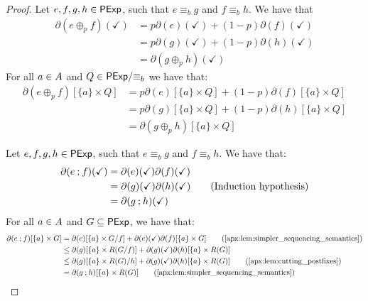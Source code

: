 \begin{proof}
    \item {}
    Let $e,f,g,h \in \mathsf{PExp}$, such that $e \equiv_b g$ and $f \equiv_b h$. We have that
    \begin{align*}
        \partial(e \oplus_p f)(\checkmark) &= p\partial(e)(\checkmark) + (1-p)\partial(f)(\checkmark) \\
        &= p\partial(g)(\checkmark) + (1-p)\partial(h)(\checkmark) \tag{Induction hypothesis}\\
        &= \partial(g \oplus_p h)(\checkmark)
    \end{align*}
    For all $a \in {A}$ and $Q \in {\mathsf{PExp}}/{\equiv_b}$ we have that:
    \begin{align*}
        \partial(e \oplus_p f)[\{a\} \times Q]&= p\partial(e)[\{a\} \times Q] + (1-p)\partial(f)[\{a\} \times Q] \\
        &= p\partial(g)[\{a\} \times Q] + (1-p)\partial(h)[\{a\} \times Q] \tag{Induction hypothesis}\\
        &= \partial(g \oplus_p h)[\{a\} \times Q]
    \end{align*}
    \item {} Let $e,f,g,h \in \mathsf{PExp}$, such that $e \equiv_b g$ and $f \equiv_b h$.
    We have that:
    \begin{align*}
        \partial(e \mathbin{;} f)(\checkmark) &= \partial(e)(\checkmark)\partial(f)(\checkmark) \\
        &=\partial(g)(\checkmark)\partial(h)(\checkmark) \tag{Induction hypothesis} \\
        &=\partial(g \mathbin{;} h)(\checkmark)
    \end{align*}
    For all $a \in {A}$ and $G \subseteq \mathsf{PExp}$, we have that:
    \begin{align*}
        \partial(e \seq f)[\{a\} \times G] &= \partial(e)[\{a\}\times G/{f}] + \partial(e)(\checkmark)\partial(f)[\{a\} \times G] \tag{\Cref{apx:lem:simpler_sequencing_semantics}}\\
        &\leq \partial(g)[\{a\} \times R(G/f)] + \partial(g)(\checkmark)\partial(h)[\{a\} \times R(G)]\\
        &\leq \partial(g)[\{a\} \times R(G)/h] + \partial(g)(\checkmark)\partial(h)[\{a\} \times R(G)] \tag{\Cref{apx:lem:cutting_postfixes}} \\
        &= \partial(g \seq h)[\{a\} \times R(G)] \tag{\Cref{apx:lem:simpler_sequencing_semantics}}
    \end{align*}


\end{proof}
